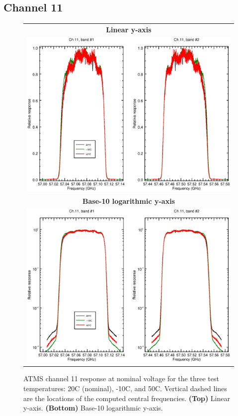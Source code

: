 \subsection{Channel 11}
\begin{figure}[H]
  \label{fig:Tset.ch11_response}
  \centering
  \begin{tabular}{c}
    \hspace{0.75cm}\sffamily\textbf{Linear y-axis} \\
    \includegraphics[scale=0.55]{graphics/srf/Tset/lin/atms_npp-11.eps} \\
    \hspace{0.75cm}\sffamily\textbf{Base-10 logarithmic y-axis} \\
    \includegraphics[scale=0.55]{graphics/srf/Tset/log/atms_npp-11.eps}
  \end{tabular}
  \caption{ATMS channel 11 response at nominal voltage for the three test temperatures: 20\textdegree{}C (nominal), -10\textdegree{}C, and 50\textdegree{}C. Vertical dashed lines are the locations of the computed central frequencies. \textbf{(Top)} Linear y-axis. \textbf{(Bottom)} Base-10 logarithmic y-axis.}
\end{figure}

